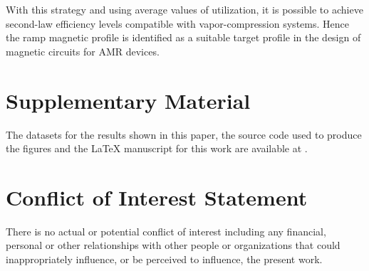 \documentclass[referee]{svjour3}
\begin{document}
With this strategy and using average values of utilization, it is possible to achieve second-law efficiency levels compatible with vapor-compression systems. Hence the ramp magnetic profile is identified as a suitable target profile in the design of magnetic circuits for AMR devices.

\section*{Supplementary Material}
\label{sec:suppl-mater}

The datasets for the results shown in this paper, the source code used to produce the figures and the \LaTeX{} manuscript for this work are available at \cite{bib:fortkamp19-repo-pprof}.

\section*{Conflict of Interest Statement}

There is no actual or potential conflict of interest including any financial, personal or other relationships with other people or organizations that could inappropriately influence, or be perceived to influence, the present work.






\end{document}
